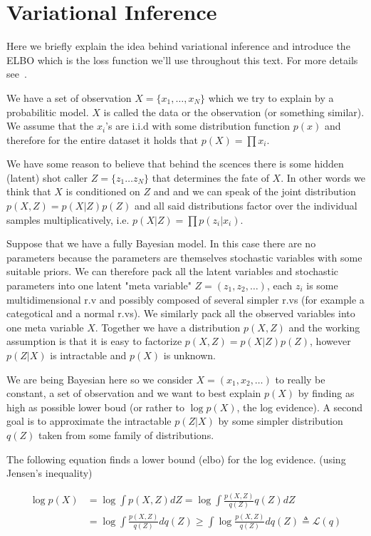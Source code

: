 \documentclass[11pt, a4paper]{report}
\theoremstyle{plain}
\theoremstyle{definition}
\theoremstyle{remark}
\begin{document}
\section{Variational Inference}

Here we briefly explain the idea behind variational inference and introduce the
ELBO which is the loss function we'll use throughout this text.
For more details see~.

We have a set of observation $X = \{x_1, \dots , x_N\}$ which we try to explain
by a probabilitic model. 
$X$ is called the data or the observation (or something similar). We assume that
the $x_i$'s are i.i.d with some distribution function $p(x)$ and therefore for
the entire dataset it holds that $p(X) = \prod x_i$.

We have some reason to believe that behind the scences there is some hidden
(latent) shot caller $Z = \{z_1 \dots z_N\}$ that determines the fate of $X$.
In other words we think that $X$ is conditioned on $Z$ and and we can speak of
the joint distribution $p(X,Z) = p(X|Z)p(Z)$ and all said distributions factor
over the individual samples multiplicatively, i.e.
$p(X|Z) = \prod p(z_i | x_i)$.

Suppose that we have a fully Bayesian model. In this case there are no
parameters because the parameters are themselves stochastic variables with some
suitable priors. We can therefore pack all the latent variables and stochastic
parameters into one latent "meta variable" $Z = (z_1, z_2, \dots )$, each $z_i$
is some multidimensional r.v and possibly composed of several simpler r.vs (for
example a categotical and a normal r.vs).
We similarly pack all the observed variables into one meta variable $X$.
Together we have a distribution $p(X,Z)$ and the working assumption is that it
is easy to factorize $p(X,Z) = p(X|Z)p(Z)$, however $p(Z|X)$ is intractable and
$p(X)$ is unknown.

We are being Bayesian here so we consider $X = (x_1, x_2, \dots)$ to really be
constant, a set of observation and we want to best explain $p(X)$ by finding as
high as possible lower boud (or rather to $\log p(X)$, the log evidence).
A second goal is to approximate the intractable $p(Z|X)$ by some simpler
distribution $q(Z)$ taken from some family of distributions.

The following equation finds a lower bound (elbo) for the log evidence.
(using Jensen's inequality)

\begin{equation}\label{eq:elbo}
\begin{aligned}
\log p(X) &= \log \int p(X,Z) dZ = \log \int \frac{p(X,Z)}{q(Z)} q(Z)dZ \\
&= \log \int \frac{p(X,Z)}{q(Z)}dq(Z) 
\geq \int \log \frac{p(X,Z)}{q(Z)}dq(Z) 
\triangleq \mathcal{L}(q)
\end{aligned}
\end{equation}
\end{document}
